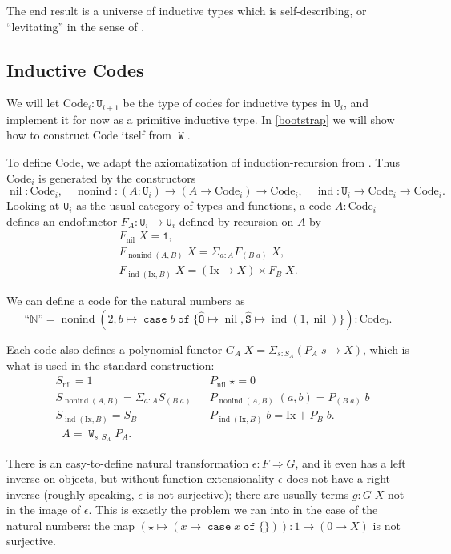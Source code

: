 \documentclass[a4paper,UKenglish,cleveref,nameinlink,autoref,thm-restate]{lipics-v2019}
\newcommand{\one}{\mathtt{1}}
\newcommand{\codeO}{\mathtt{\hat{O}}}
\newcommand{\codeS}{\mathtt{\hat{S}}}
\newcommand{\U}{\mathtt{U}}
\newcommand{\N}{\hyperref[define-N]{\mathbb{N}}}
\DeclareMathOperator{\case}{\mathtt{case}}
\newcommand{\caset}[2]{\case {#1}\;\mathtt{of}\;\{{#2}\}}
\DeclareMathOperator{\W}{\mathtt{W}}
\DeclareMathOperator{\nonind}{nonind}
\DeclareMathOperator{\ind}{ind}
\DeclareMathOperator{\nil}{nil}
\newcommand{\Code}{\mathrm{Code}}
\newcommand{\Ix}{\mathrm{Ix}}
\DeclareMathOperator{\preEl}{\tilde{El}}
\newcommand{\mathquote}[1]{\text{``${#1}$''}}
\begin{document}
The end result is a universe of inductive types which is self-describing, or ``levitating'' in the sense of \cite{levitation}.

\subsection{Inductive Codes}\label{inductive-codes}
We will let $\Code_i : \U_{i+1}$ be the type of codes for inductive types in $\U_i$, and implement it for now as a primitive inductive type. In \cref{bootstrap} we will show how to construct $\Code$ itself from $\W$.

To define $\Code$, we adapt the axiomatization of induction-recursion from \cite{finite-axiom-IR}. Thus $\Code_i$ is generated by the constructors
\[\nil : \Code_i,\quad \nonind : (A : \U_i) \to (A \to \Code_i) \to \Code_i, \quad \ind : \U_i \to \Code_i \to \Code_i.\]
Looking at $\U_i$ as the usual category of types and functions, a code $A : \Code_i$ defines an endofunctor $F_A : \U_i \to \U_i$ defined by recursion on $A$ by
\begin{gather}
F_{\nil}\;X = \one,\\
F_{\nonind(A,B)}\;X = \Sigma_{a : A} F_{(B\;a)}\; X,\\
F_{\ind(\Ix, B)}\;X = (\Ix \to X) \times F_{B}\; X.
\end{gather}

\begin{example}We can define a code for the natural numbers as \[\mathquote{\N} = \nonind(2, b \mapsto \caset{b}{\codeO \mapsto \nil, \codeS\mapsto \ind(1, \nil)}) : \Code_0.\]
\end{example}

Each code also defines a polynomial functor $G_A\;X = \Sigma_{s : S_A} (P_A\;s \to X)$, which is what is used in the standard construction:
\begin{align}
&S_{\nil} = 1 & &P_{\nil}\;\star = 0\\
&S_{\nonind(A,B)} = \Sigma_{a : A} S_{(B\;a)} & &P_{\nonind(A, B)}\;(a,b) = P_{(B\;a)}\;b \\
&S_{\ind(\Ix, B)} = S_B & &P_{\ind(\Ix, B)}\;b = \Ix + P_B\;b.\\
&\preEl A = \W_{s : S_A}P_A.
\end{align}

There is an easy-to-define natural transformation $\epsilon : F \Rightarrow G$, and it even has a left inverse on objects, but without function extensionality $\epsilon$ does not have a right inverse (roughly speaking, $\epsilon$ is not surjective); there are usually terms $g : G\;X$ not in the image of $\epsilon$. This is exactly the problem we ran into in the case of the natural numbers: the map $(\star \mapsto (x \mapsto \caset{x}{})) : 1 \to (0 \to X)$ is not surjective.
\end{document}
